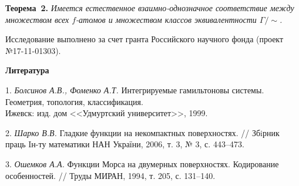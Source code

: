 \textbf{Теорема~2.} {\it Имеется естественное взаимно-однознач\-ное соответствие между множеством всех $f$-атомов и множеством классов эквивалентности $\mathfrak\Gamma/\sim$.}

Исследование выполнено за счет гранта Российского научного фонда (проект №17-11-01303).

\smallskip \centerline{\bf Литература}\nopagebreak

1. {\it Болсинов А.В., Фоменко А.Т.} Интегрируемые гамильтоновы системы. Геометрия, топология, классификация.\\ Ижевск: изд. дом <<Удмуртский университет>>, 1999.

2. {\it Шарко В.В.} Гладкие функции на некомпактных поверхностях. // Збiрник праць Iн-ту математики НАН України, 2006, т. 3, № 3, с. 443--473.

3. {\it Ошемков А.А.} Функции Морса на двумерных поверхностях. Кодирование особенностей. // Труды МИРАН, 1994, т. 205, с. 131--140.

